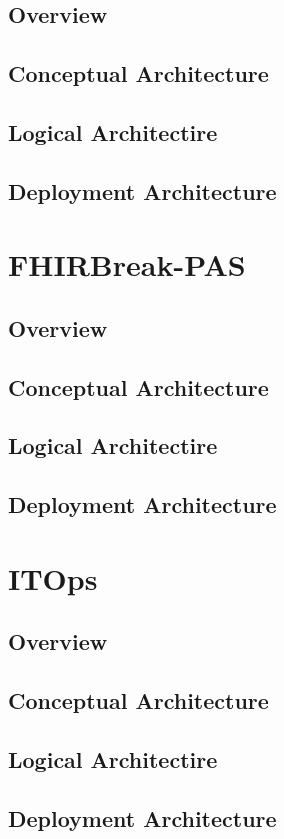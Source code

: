 \documentclass[a4paper]{book}
\begin{document}
\section{Overview}
\section{Conceptual Architecture}
\section{Logical Architectire}
\section{Deployment Architecture}

\chapter{FHIRBreak-PAS}
\section{Overview}
\section{Conceptual Architecture}
\section{Logical Architectire}
\section{Deployment Architecture}

\chapter{ITOps}
\section{Overview}
\section{Conceptual Architecture}
\section{Logical Architectire}
\section{Deployment Architecture}
\end{document}
